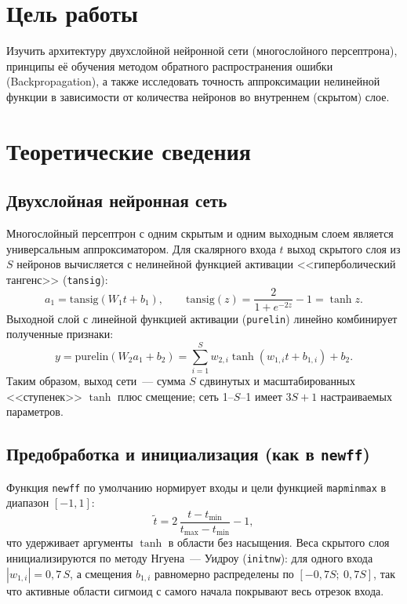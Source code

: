\documentclass[14pt,a4paper]{extarticle}
\begin{document}

\tableofcontents

\newpage

\section{Цель работы}

Изучить архитектуру двухслойной нейронной сети (многослойного персептрона), принципы её обучения методом обратного распространения ошибки (Backpropagation), а также исследовать точность аппроксимации нелинейной функции в зависимости от количества нейронов во внутреннем (скрытом) слое.

\section{Теоретические сведения}

\subsection{Двухслойная нейронная сеть}

Многослойный персептрон с одним скрытым и одним выходным слоем является универсальным аппроксиматором. Для скалярного входа $t$ выход скрытого слоя из $S$ нейронов вычисляется с нелинейной функцией активации <<гиперболический тангенс>> (\texttt{tansig}):
\begin{equation}
a_1 = \mathrm{tansig}(W_1 t + b_1), \qquad \mathrm{tansig}(z) = \frac{2}{1 + e^{-2z}} - 1 = \tanh z .
\end{equation}
Выходной слой с линейной функцией активации (\texttt{purelin}) линейно комбинирует полученные признаки:
\begin{equation}
y = \mathrm{purelin}(W_2 a_1 + b_2) = \sum_{i=1}^{S} w_{2,i} \tanh(w_{1,i} t + b_{1,i}) + b_2 .
\end{equation}
Таким образом, выход сети~--- сумма $S$ сдвинутых и масштабированных <<ступенек>> $\tanh$ плюс смещение; сеть 1--$S$--1 имеет $3S + 1$ настраиваемых параметров.

\subsection{Предобработка и инициализация (как в \texttt{newff})}

Функция \texttt{newff} по умолчанию нормирует входы и цели функцией \texttt{mapminmax} в диапазон $[-1, 1]$:
\begin{equation}
\tilde t = 2\,\frac{t - t_{\min}}{t_{\max} - t_{\min}} - 1,
\end{equation}
что удерживает аргументы $\tanh$ в области без насыщения. Веса скрытого слоя инициализируются по методу Нгуена~--- Уидроу (\texttt{initnw}): для одного входа $|w_{1,i}| = 0{,}7\,S$, а смещения $b_{1,i}$ равномерно распределены по $[-0{,}7S;\ 0{,}7S]$, так что активные области сигмоид с самого начала покрывают весь отрезок входа.
\end{document}
